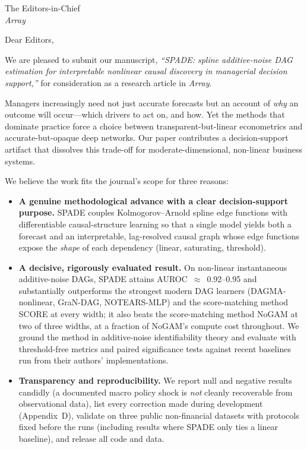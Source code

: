 \documentclass[11pt]{letter}
\begin{document}
\begin{letter}{The Editors-in-Chief \\ \emph{Array}}

\opening{Dear Editors,}

We are pleased to submit our manuscript, \emph{``SPADE: spline additive-noise DAG
estimation for interpretable nonlinear causal discovery in managerial decision
support,''} for consideration as a research article in \emph{Array}.

Managers increasingly need not just accurate forecasts but an account of
\emph{why} an outcome will occur---which drivers to act on, and how. Yet the
methods that dominate practice force a choice between transparent-but-linear
econometrics and accurate-but-opaque deep networks. Our paper contributes a
decision-support artifact that dissolves this trade-off for
moderate-dimensional, non-linear business systems.

We believe the work fits the journal's scope for three reasons:
\begin{itemize}
  \item \textbf{A genuine methodological advance with a clear decision-support
  purpose.} SPADE couples Kolmogorov--Arnold spline edge functions with
  differentiable causal-structure learning so that a single model yields both a
  forecast and an interpretable, lag-resolved causal graph whose edge functions
  expose the \emph{shape} of each dependency (linear, saturating, threshold).
  \item \textbf{A decisive, rigorously evaluated result.} On non-linear
  instantaneous additive-noise DAGs, SPADE attains AUROC~$\approx$~0.92--0.95 and
  substantially outperforms the strongest modern DAG learners (DAGMA-nonlinear,
  GraN-DAG, NOTEARS-MLP) and the score-matching method SCORE at every width; it
  also beats the score-matching method NoGAM at two of three widths, at a
  fraction of NoGAM's compute cost throughout. We ground the
  method in additive-noise identifiability
  theory and evaluate with threshold-free metrics and paired significance tests
  against recent baselines run from their authors' implementations.
  \item \textbf{Transparency and reproducibility.} We report null and negative
  results candidly (a documented macro policy shock is \emph{not} cleanly
  recoverable from observational data), list every correction made during development (Appendix~D), validate on three public non-financial datasets with protocols fixed before the runs (including results where SPADE only ties a linear baseline), and release all code and data.
\end{itemize}


\end{letter}
\end{document}
